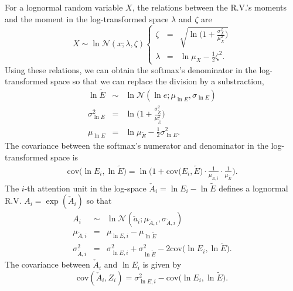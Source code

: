 \documentclass{article}
\begin{document}
For a lognormal random variable $X$, the relations between the R.V.'s moments and the moment in the log-transformed space $\lambda$ and $\zeta$ are
\begin{equation}
X\sim\ln\mathcal{N}(x;\lambda,\zeta)\left\{\begin{array}{rcl}
\zeta&=&\sqrt{\ln\big(1+\frac{\sigma_X^2}{\mu_X^2}\big)}\\[2pt]
\lambda&=&\ln \mu_X-\tfrac{1}{2}\zeta^2.
\end{array}\right.
\end{equation}
Using these relations, we can obtain the softmax's denominator in the log-transformed space so that we can replace the division by a substraction,
\begin{equation}
\begin{array}{rcl}
\ln \tilde{E}&\sim&\ln\mathcal{N}(\ln{e};\mu_{\ln{E}},\sigma_{\ln{E}})\\[2pt]
\sigma_{\ln{E}}^2&=&\ln\big(1+\frac{\sigma_{\tilde{E}}^2}{\mu_{\tilde{E}}^2}\big)\\[4pt]
\mu_{\ln{E}}&=&\ln\mu_{\tilde{E}}-\tfrac{1}{2}\sigma_{\ln{E}}^2.
\end{array}
\end{equation}
The covariance between the softmax's numerator and denominator in the log-transformed space is 
\begin{equation}
\label{eq_cov_z_e_check}
\begin{array}{rcl}
\text{cov}\big(\ln E_i,\ln \tilde{E}\big)=\ln\big(1+\text{cov}\big(E_i,\tilde{E}\big)\cdot\frac{1}{\mu_{E,i}}\cdot \frac{1}{\mu_{\tilde{E}}}\big).   
\end{array}
\end{equation}
The $i$-th attention unit in the log-space $\check{A}_i=\ln{E}_i-\ln \tilde{E}$ defines a lognormal R.V. $A_i=\exp(\check{A}_i)$ so that
\begin{equation}
\label{eq_log_act}
\begin{array}{rcl}
A_i&\sim&\ln\mathcal{N}(\check{a}_i;{\mu}_{\check{A},i},{\sigma}_{\check{A},i})\\[2pt]
\mu_{\check{A},i}&=&\mu_{\ln{E},i}-\mu_{\ln \tilde{E}}\\[2pt]
\sigma_{\check{A},i}^2&=&\sigma_{\ln{E},i}^2+\sigma_{\ln \tilde{E}}^2-2\text{cov}\big(\ln E_i,\ln \tilde{E}\big).
\end{array}
\end{equation}
The covariance between $\check{A}_i$ and $\ln E_i$ is given by
\begin{equation}
\text{cov}(\check{A}_i,Z_i)=\sigma_{\ln E,i}^2-\text{cov}\big(\ln E_i,\ln \tilde{E}\big).
\end{equation}
\end{document}
